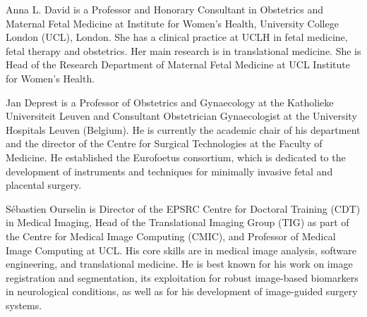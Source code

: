 \documentclass[10pt,journal,compsoc]{IEEEtran}
\begin{document}

\begin{IEEEbiography}{Anna L. David} is a Professor and Honorary Consultant in Obstetrics and Maternal Fetal Medicine at Institute for Women's Health, University College London (UCL), London. She has a clinical practice at UCLH in fetal medicine, fetal therapy and obstetrics. Her main research is in translational medicine. She is Head of the Research Department of Maternal Fetal Medicine at UCL Institute for Women's Health. 
\end{IEEEbiography}

\begin{IEEEbiography}{Jan Deprest} is a Professor of Obstetrics and Gynaecology at the Katholieke Universiteit Leuven and Consultant Obstetrician Gynaecologist at the University Hospitals Leuven (Belgium). He is currently the academic chair of his department and the director of the Centre for Surgical Technologies at the Faculty of Medicine. He established the Eurofoetus consortium, which is dedicated to the development of instruments and techniques for minimally invasive fetal and placental surgery. 
\end{IEEEbiography}


\begin{IEEEbiography}{S\'ebastien Ourselin}
	is %
	Director of the EPSRC Centre for Doctoral Training (CDT) in Medical Imaging, Head of the Translational Imaging Group (TIG) as part of the Centre for Medical Image Computing (CMIC), and Professor of Medical Image Computing at UCL. His core skills are in medical image analysis, software engineering, and translational medicine. He is best known for his work on image registration and segmentation, its exploitation for robust image-based biomarkers in neurological conditions, as well as for his development of image-guided surgery systems. %
\end{IEEEbiography}
\end{document}

